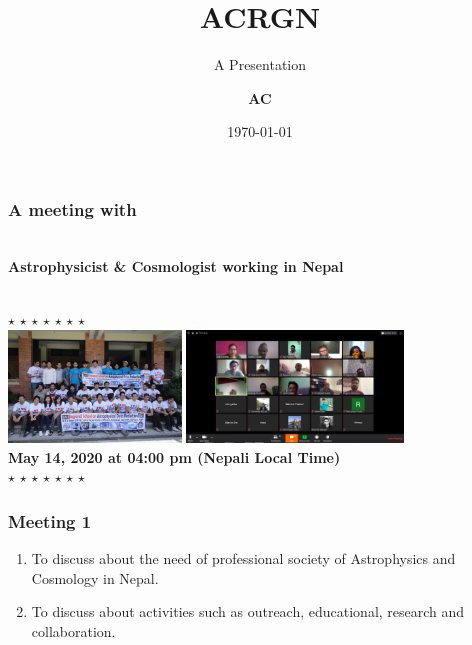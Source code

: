 \documentclass{beamer}
\author{\bf{AC }}
\institute{Research Group-Nepal}
\title[ACRGN]{\Huge\bf{ACRGN}}
\subtitle{A Presentation}
\date{\today}
\begin{document}
		\begin{frame}
	\begin{center}
		{	\frametitle{\hspace{1.5cm}\Huge\bf{\Huge A meeting with}} \\[0.3cm] \color{blue}\LARGE \bf \color{red} Astrophysicist  \& Cosmologist working in \color{blue} Nepal  \\\color{blue}}\\[0.3cm]
		\Huge\color{red} $\star$ \color{orange} $\star$ 	\Huge\color{yellow} $\star$ \Huge\color{green} $\star$  \Huge\color{blue} $\star$  \Huge\color{indigo} $\star$  \Huge\color{violet} $\star$ \\
		\vspace{0.3cm}
				\includegraphics[height=3cm]{A}
					\includegraphics[height=3cm]{21}\\
%					
						{\color{blue}\footnotesize \bf   May 14, 2020 at \color{red}04:00 pm (Nepali Local Time)\\[0.2cm]}
			\Huge\color{red} $\star$ \color{orange} $\star$ 	\Huge\color{yellow} $\star$ \Huge\color{green} $\star$  \Huge\color{blue} $\star$  \Huge\color{indigo}$\star$  \Huge\color{violet} $\star$ 			
	\end{center}
		\end{frame}
		
	\begin{frame}
\frametitle{\bf  Meeting 1}	
\begin{enumerate}
	\bf 
\item \color{red}To discuss about the need of professional society of Astrophysics and Cosmology in Nepal. 
\item \color{blue} To discuss about activities such as outreach, educational, research and collaboration.
\end{enumerate}
	\end{frame}
\end{document}
